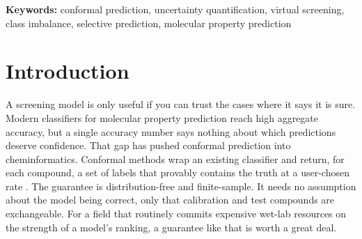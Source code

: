 \documentclass[11pt]{article}
\begin{document}
\begin{abstract}
and overall coverage stay reassuringly high throughout, which is exactly why it is easy to miss.
Class-conditional (Mondrian) conformal prediction closes the gap on every dataset, returning
minority coverage to target for a modest increase in prediction-set size; adaptive prediction sets
(APS), by contrast, reach nominal minority coverage only by returning uninformative two-label sets
for nearly every minority compound. We localize the marginal failures to a handful of generic
molecular scaffolds---plain benzene and pyridine cores that occur in both classes---propose a
one-number diagnostic (the minority coverage gap), and show with a direction-aware cost model that
abstaining on the affected compounds flips a screening campaign from net-negative to net-positive
utility, with the size of that swing set by whether the campaign's goal is to find or to avoid the
class in question. The marginal--conditional distinction is well known in the conformal
literature; our contribution is to demonstrate on real chemistry how severe and how invisible it
becomes under imbalance, to explain it quantitatively, to turn that explanation into a validated
pre-flight predictive check, to show ordinary class rebalancing does not substitute for
class-conditional calibration, and to lay out a practical, cost-aware protocol that restores
per-class reliability.
\end{abstract}

\noindent\textbf{Keywords:} conformal prediction, uncertainty quantification, virtual screening,
class imbalance, selective prediction, molecular property prediction

\section{Introduction}

A screening model is only useful if you can trust the cases where it says it is sure. Modern
classifiers for molecular property prediction reach high aggregate accuracy, but a single accuracy
number says nothing about which predictions deserve confidence. That gap has pushed conformal
prediction into cheminformatics. Conformal methods wrap an existing classifier and return, for
each compound, a set of labels that provably contains the truth at a user-chosen rate
\cite{vovk2005,angelopoulos2023}. The guarantee is distribution-free and finite-sample. It needs no
assumption about the model being correct, only that calibration and test compounds are
exchangeable. For a field that routinely commits expensive wet-lab resources on the strength of a
model's ranking, a guarantee like that is worth a great deal.
\end{document}
